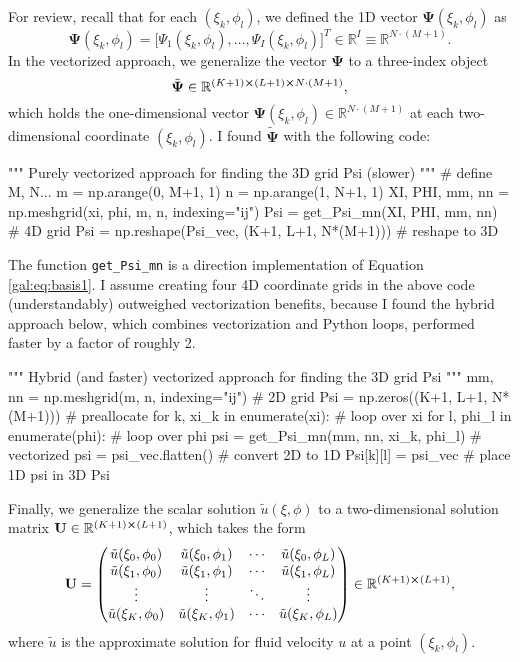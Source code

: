 \documentclass[11pt, a4paper]{article}
\newcommand{\mat}[1]{\mathbf{#1}}
\renewcommand{\t}[1]{\tilde{#1}}
\renewcommand{\vec}[1]{\bm{#1}}
\begin{document}
For review, recall that for each $ (\xi_{k}, \phi_{l}) $, we defined the 1D vector $ \bm{\Psi}(\xi_{k}, \phi_{l}) $ as
\begin{equation*}
	\bm{\Psi}(\xi_{k}, \phi_{l}) = \big[\Psi_{1}(\xi_{k}, \phi_{l}), \ldots, \Psi_{I}(\xi_{k}, \phi_{l}) \big]^{T} \in \mathbb{R}^{I} \equiv \mathbb{R}^{N\cdot(M+1)}.
\end{equation*}
In the vectorized approach, we generalize the vector $ \vec{\Psi} $ to a three-index object 
\begin{equation*}
	\t{\bm{\Psi}} \in \mathbb{R}^{(K+1)\cross(L+1)\cross N\cdot(M+1)},
\end{equation*}
which holds the one-dimensional vector $ \bm{\Psi}(\xi_{k}, \phi_{l}) \in  \mathbb{R}^{N\cdot(M+1)} $ at each two-dimensional coordinate $ (\xi_{k}, \phi_{l}) $. I found $ \t{\bm{\Psi}} $ with the following code:
\begin{python}
""" Purely vectorized approach for finding the 3D grid Psi (slower) """
# define M, N...
m = np.arange(0, M+1, 1)
n = np.arange(1, N+1, 1)
XI, PHI, mm, nn = np.meshgrid(xi, phi, m, n, indexing="ij")
Psi = get_Psi_mn(XI, PHI, mm, nn)  # 4D grid
Psi = np.reshape(Psi_vec, (K+1, L+1, N*(M+1)))  # reshape to 3D
\end{python}
The function \texttt{get\_Psi\_mn} is a direction implementation of Equation \ref{gal:eq:basis1}. I assume creating four 4D coordinate grids in the above code (understandably) outweighed vectorization benefits, because I found the hybrid approach below, which combines vectorization and Python loops, performed faster by a factor of roughly 2.
\begin{python}
""" Hybrid (and faster) vectorized approach for finding the 3D grid Psi """
mm, nn = np.meshgrid(m, n, indexing="ij")      # 2D grid
Psi = np.zeros((K+1, L+1, N*(M+1)))            # preallocate
for k, xi_k in enumerate(xi):                  # loop over xi
    for l, phi_l in enumerate(phi):            # loop over phi
        psi = get_Psi_mn(mm, nn, xi_k, phi_l)  # vectorized
        psi = psi_vec.flatten()                # convert 2D to 1D
        Psi[k][l] = psi_vec  # place 1D psi in 3D Psi
\end{python}
Finally, we generalize the scalar solution $ \t{u}(\xi, \phi) $ to a two-dimensional solution matrix $ \mat{U} \in \mathbb{R}^{(K+1)\cross (L+1)} $, which takes the form
\begin{equation*}
	\mat{U} = 
	\begin{pmatrix}
		\t{u}(\xi_{0}, \phi_{0})  & \t{u}(\xi_{0}, \phi_{1}) & \cdots &  \t{u}(\xi_{0}, \phi_{L}) \\
		\t{u}(\xi_{1}, \phi_{0})  & \t{u}(\xi_{1}, \phi_{1}) & \cdots &  \t{u}(\xi_{1}, \phi_{L}) \\
		\vdots & \vdots & \ddots & \vdots \\
		\t{u}(\xi_{K}, \phi_{0})  & \t{u}(\xi_{K}, \phi_{1}) & \cdots &  \t{u}(\xi_{K}, \phi_{L}) 
	\end{pmatrix}
	\in \mathbb{R}^{(K+1) \cross (L+1)},
\end{equation*}
where $ \t{u} $ is the approximate solution for fluid velocity $ u $ at a point $ (\xi_{k}, \phi_{l}) $.
\end{document}
